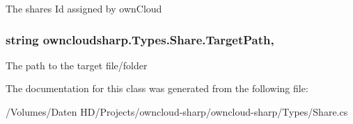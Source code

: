 The shares Id assigned by own\+Cloud 

\hypertarget{classowncloudsharp_1_1_types_1_1_share_ac2ac95075f60cc369c9f2433f6b4db7d}{}
\subsubsection[{Target\+Path}]{\setlength{\rightskip}{0pt plus 5cm}string owncloudsharp.\+Types.\+Share.\+Target\+Path\hspace{0.3cm}{\ttfamily [get]}, {\ttfamily [set]}}\label{classowncloudsharp_1_1_types_1_1_share_ac2ac95075f60cc369c9f2433f6b4db7d}


The path to the target file/folder 



The documentation for this class was generated from the following file\+:\begin{DoxyCompactItemize}
\item 
/\+Volumes/\+Daten H\+D/\+Projects/owncloud-\/sharp/owncloud-\/sharp/\+Types/Share.\+cs\end{DoxyCompactItemize}
